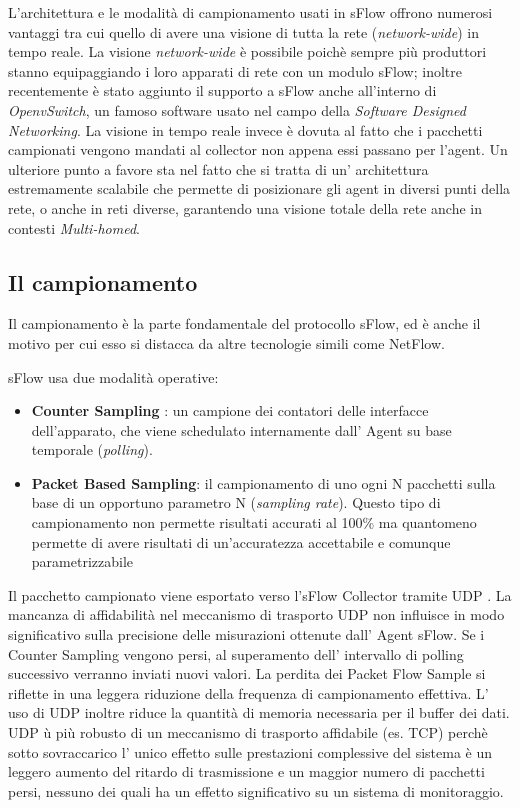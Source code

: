\documentclass[12pt,a4paper,openright,twoside]{report}
\begin{document}
L'architettura e le modalit\`a di campionamento usati in sFlow offrono numerosi vantaggi
tra cui quello di avere una visione di tutta la rete ({\it network-wide}) in tempo
reale. La visione {\it network-wide} \`e possibile poich\`e sempre pi\`u produttori
stanno equipaggiando i loro apparati di rete con un modulo sFlow; inoltre recentemente
\`e stato aggiunto il supporto a sFlow anche all'interno di {\it OpenvSwitch}, un
famoso software usato nel campo della {\it Software Designed Networking}.
 La visione in tempo reale invece \`e dovuta al fatto che i pacchetti campionati
 vengono mandati al collector non appena essi passano per
l'agent.
Un ulteriore punto a favore sta nel fatto che si tratta di un' architettura
estremamente scalabile che permette di posizionare gli agent in diversi punti della rete,
o anche in reti diverse, garantendo una visione totale della rete anche in contesti
{\it Multi-homed}.

\subsection{Il campionamento}

Il campionamento \`e la parte fondamentale del protocollo sFlow, ed \`e anche
il motivo per cui esso si distacca da altre tecnologie simili come NetFlow.

sFlow usa due modalit\`a operative:
\begin{itemize}
  \item {\bf Counter Sampling} : un campione dei contatori delle interfacce dell'apparato, che viene
  schedulato internamente dall' Agent su base temporale ({\it polling}).
  \item {\bf Packet Based Sampling}: il campionamento di uno ogni N pacchetti
  sulla base di un opportuno parametro N ({\it sampling rate}). Questo tipo di campionamento non
  permette risultati accurati al 100\% ma quantomeno permette di avere risultati
  di un'accuratezza accettabile e comunque parametrizzabile
\end{itemize}

Il pacchetto campionato viene esportato verso l'sFlow Collector tramite UDP \cite{B1}.
La mancanza di affidabilit\`a nel meccanismo di trasporto UDP non influisce in modo
significativo sulla precisione delle misurazioni ottenute dall' Agent sFlow. Se
i Counter Sampling vengono persi, al superamento dell' intervallo di polling
successivo verranno inviati nuovi valori.  La perdita dei Packet Flow Sample si riflette in
una leggera riduzione della frequenza di campionamento effettiva.  L' uso di UDP
inoltre riduce la quantit\`a di memoria necessaria per il buffer dei dati. UDP \`u pi\`u
robusto di un meccanismo di trasporto  affidabile (es. TCP) perch\`e sotto sovraccarico
l' unico effetto sulle prestazioni complessive del sistema \`e un leggero aumento
del ritardo di trasmissione e un maggior numero di pacchetti persi, nessuno dei
quali ha un effetto significativo su un sistema di monitoraggio.
\end{document}
